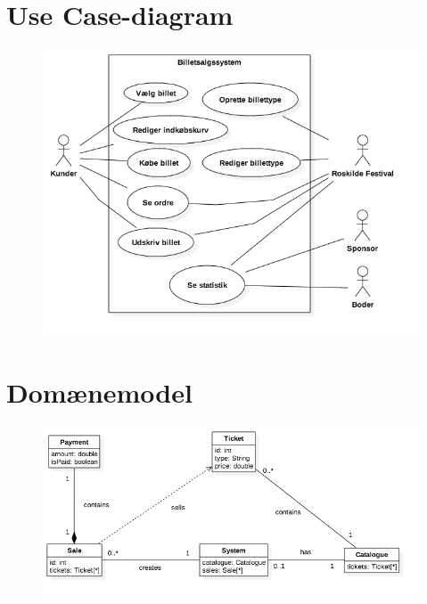 \section{Use Case-diagram}
\begin{figure}[H]
    \begin{center}
        \includegraphics[width=1\textwidth]{UseCaseDiagram.png}
    \end{center}
\end{figure}

\section{Domænemodel}
\begin{figure}[H]
    \begin{center}
        \includegraphics[width=1\textwidth]{Domainmodel.png}
    \end{center}
\end{figure}

